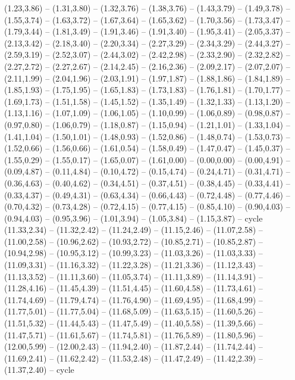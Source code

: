 \expandafter\def\csname geo:gebiet:heute-FRA\endcsname{
  (1.23,3.86) -- (1.31,3.80) -- (1.32,3.76) -- (1.38,3.76) -- (1.43,3.79) -- (1.49,3.78) -- (1.55,3.74) -- (1.63,3.72) -- (1.67,3.64) -- (1.65,3.62) -- (1.70,3.56) -- (1.73,3.47) -- (1.79,3.44) -- (1.81,3.49) -- (1.91,3.46) -- (1.91,3.40) -- (1.95,3.41) -- (2.05,3.37) -- (2.13,3.42) -- (2.18,3.40) -- (2.20,3.34) -- (2.27,3.29) -- (2.34,3.29) -- (2.44,3.27) -- (2.59,3.19) -- (2.52,3.07) -- (2.44,3.02) -- (2.42,2.98) -- (2.33,2.90) -- (2.32,2.82) -- (2.27,2.72) -- (2.27,2.67) -- (2.14,2.45) -- (2.16,2.36) -- (2.09,2.17) -- (2.07,2.07) -- (2.11,1.99) -- (2.04,1.96) -- (2.03,1.91) -- (1.97,1.87) -- (1.88,1.86) -- (1.84,1.89) -- (1.85,1.93) -- (1.75,1.95) -- (1.65,1.83) -- (1.73,1.83) -- (1.76,1.81) -- (1.70,1.77) -- (1.69,1.73) -- (1.51,1.58) -- (1.45,1.52) -- (1.35,1.49) -- (1.32,1.33) -- (1.13,1.20) -- (1.13,1.16) -- (1.07,1.09) -- (1.06,1.05) -- (1.10,0.99) -- (1.06,0.89) -- (0.98,0.87) -- (0.97,0.80) -- (1.06,0.79) -- (1.18,0.87) -- (1.15,0.94) -- (1.21,1.01) -- (1.33,1.04) -- (1.41,1.04) -- (1.50,1.01) -- (1.48,0.93) -- (1.52,0.86) -- (1.48,0.74) -- (1.53,0.73) -- (1.52,0.66) -- (1.56,0.66) -- (1.61,0.54) -- (1.58,0.49) -- (1.47,0.47) -- (1.45,0.37) -- (1.55,0.29) -- (1.55,0.17) -- (1.65,0.07) -- (1.61,0.00) -- (0.00,0.00) -- (0.00,4.91) -- (0.09,4.87) -- (0.11,4.84) -- (0.10,4.72) -- (0.15,4.74) -- (0.24,4.71) -- (0.31,4.71) -- (0.36,4.63) -- (0.40,4.62) -- (0.34,4.51) -- (0.37,4.51) -- (0.38,4.45) -- (0.33,4.41) -- (0.33,4.37) -- (0.49,4.31) -- (0.63,4.34) -- (0.66,4.43) -- (0.72,4.48) -- (0.77,4.46) -- (0.70,4.32) -- (0.73,4.28) -- (0.72,4.15) -- (0.77,4.15) -- (0.85,4.10) -- (0.90,4.03) -- (0.94,4.03) -- (0.95,3.96) -- (1.01,3.94) -- (1.05,3.84) -- (1.15,3.87) -- cycle}
\expandafter\def\csname geo:gebiet:heute-UKR\endcsname{
  (11.33,2.34) -- (11.32,2.42) -- (11.24,2.49) -- (11.15,2.46) -- (11.07,2.58) -- (11.00,2.58) -- (10.96,2.62) -- (10.93,2.72) -- (10.85,2.71) -- (10.85,2.87) -- (10.94,2.98) -- (10.95,3.12) -- (10.99,3.23) -- (11.03,3.26) -- (11.03,3.33) -- (11.09,3.31) -- (11.16,3.32) -- (11.22,3.28) -- (11.21,3.36) -- (11.12,3.43) -- (11.13,3.52) -- (11.11,3.60) -- (11.05,3.74) -- (11.11,3.89) -- (11.14,3.91) -- (11.28,4.16) -- (11.45,4.39) -- (11.51,4.45) -- (11.60,4.58) -- (11.73,4.61) -- (11.74,4.69) -- (11.79,4.74) -- (11.76,4.90) -- (11.69,4.95) -- (11.68,4.99) -- (11.77,5.01) -- (11.77,5.04) -- (11.68,5.09) -- (11.63,5.15) -- (11.60,5.26) -- (11.51,5.32) -- (11.44,5.43) -- (11.47,5.49) -- (11.40,5.58) -- (11.39,5.66) -- (11.47,5.71) -- (11.61,5.67) -- (11.74,5.81) -- (11.76,5.89) -- (11.80,5.96) -- (12.00,5.99) -- (12.00,2.43) -- (11.94,2.40) -- (11.87,2.44) -- (11.74,2.44) -- (11.69,2.41) -- (11.62,2.42) -- (11.53,2.48) -- (11.47,2.49) -- (11.42,2.39) -- (11.37,2.40) -- cycle}
